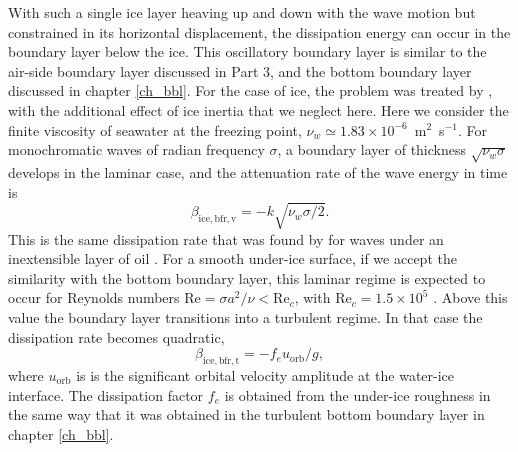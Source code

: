 With such a single ice layer heaving up and down with the wave motion but constrained in its horizontal displacement, the dissipation energy can occur in the boundary layer below the ice. This oscillatory boundary layer is similar to the air-side boundary layer discussed in Part 3, and the bottom boundary layer discussed in chapter \ref{ch_bbl}. For the case of ice, the problem was treated by \cite{Liu&MolloChristensen1988}, with the additional effect of ice inertia that we neglect here. Here we consider the finite viscosity of seawater at the freezing point, $\nu_w \simeq 1.83 \times 10^{-6}$~m$^2$~s$^{-1}$. For monochromatic waves of radian frequency $\sigma$,  a boundary layer of thickness $\sqrt{\nu_w \sigma}$ develops in the laminar case, and the attenuation rate of the wave energy in time is 
\begin{equation}
\beta_{\mathrm{ice,bfr,v}}=-k\sqrt{\nu_w \sigma / 2}.  \label{eq:beta_ice_visc}                                                                                                                                                                                                                                                                                                                                                                                                                                                                                                                                                                                                                                                                                                                                                                         
\end{equation}
This is the same dissipation rate that was found by \cite{Phillips1977} for waves under an inextensible layer of oil \citep[see also][]{Weber1987}.
For a smooth under-ice surface, if we accept the similarity with the bottom boundary layer, this laminar regime is expected to occur for Reynolds numbers $\mathrm{Re} = \sigma a^2/\nu < \mathrm{Re} _c$, with $\mathrm{Re} _c=1.5 \times 10^5$ \citep{Jensen&al.1989}. Above this value the boundary layer transitions into a turbulent regime. In that case the dissipation rate becomes quadratic,
\begin{equation}
\beta_{\mathrm{ice,bfr,t}}=-f_e u_{\mathrm{orb}} / g,\label{eq:beta_ice_turb}
\end{equation}
where $u_{\mathrm{orb}}$ is is the significant orbital velocity amplitude at the water-ice interface. 
The dissipation factor $f_e$ is obtained from the under-ice roughness in the same way that it was obtained in the turbulent bottom boundary layer in chapter \ref{ch_bbl}.

